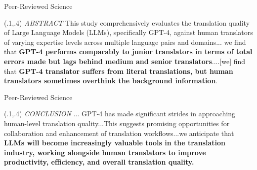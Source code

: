 \documentclass{beamer}
\begin{document}
\begin{frame}{Peer-Reviewed Science}


\begin{textblock}{1}(.1,.4)
  \small {\textit{ABSTRACT} This study comprehensively evaluates the translation quality of Large Language Models (LLMs), specifically GPT-4, against human translators of varying expertise levels across multiple language pairs and domains... we find that \textbf{GPT-4 performs comparably to junior translators in terms of total errors made but lags behind medium and senior translators}....[we] find that \textbf{GPT-4 translator suffers from literal translations, but human translators sometimes overthink the background information}.}
\end{textblock}

\end{frame}


\begin{frame}{Peer-Reviewed Science}


\begin{textblock}{1}(.1,.4)
  \small {\textit{CONCLUSION} ... GPT-4 has made significant strides in approaching human-level translation quality...This suggests promising opportunities for collaboration and enhancement of translation workflows...we anticipate that \textbf{LLMs will become increasingly valuable tools in the translation industry, working alongside human translators to improve productivity, efficiency, and overall translation quality.}}
\end{textblock}

\end{frame}
\end{document}

